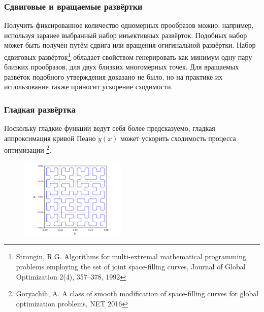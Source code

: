 \documentclass[aspectratio=1610]{beamer}
\begin{document}
\begin{frame}
  \frametitle{Сдвиговые и вращаемые развёртки}
  Получить фиксированное количество одномерных прообразов можно, например, используя заранее выбранный набор инъективных развёрток.
  Подобных набор может быть получен путём сдвига или вращения огигинальной развёртки. 
  Набор сдвиговых развёрток\footnote{Strongin, R.G. Algorithms for multi-extremal mathematical programming problems employing the set of joint space-filling curves, Journal of Global Optimization 2(4), 357--378, 1992}
  обладает свойством генерировать как минимум одну пару близких прообразов, для двух близких многомерных точек.
  Для вращаемых развёток подобного утверждения доказано не было, но на практике их использование также приносит ускорение сходимости.
  \begin{figure}[ht]
  \end{figure}
\end{frame}

\begin{frame}
  \frametitle{Гладкая развёртка}
  Поскольку гладкие функции ведут себя более предсказуемо, гладкая аппроксимация кривой Пеано \(y(x)\)
  может ускорить сходимость процесса оптимизации \footnote{Goryachih, A. A class of smooth modification of space-filling curves for global optimization problems, NET 2016}.
  \begin{figure}[ht]
    \includegraphics[width=0.45\textwidth]{evolvents/smooth.pdf}
  \end{figure}
\end{frame}
\end{document}
